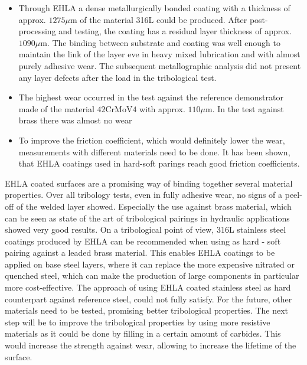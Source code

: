 \documentclass[10pt]{article}
\begin{document}
\begin{itemize}
  \item Through EHLA a dense metallurgically bonded coating with a thickness of approx. $1275 \mu \mathrm{m}$ of the material 316L could be produced. After post-processing and testing, the coating has a residual layer thickness of approx. $1090 \mu \mathrm{m}$. The binding between substrate and coating was well enough to maintain the link of the layer eve in heavy mixed lubrication and with almost purely adhesive wear. The subsequent metallographic analysis did not present any layer defects after the load in the tribological test.

  \item The highest wear occurred in the test against the reference demonstrator made of the material $42 \mathrm{CrMoV} 4$ with approx. $110 \mu \mathrm{m}$. In the test against brass there was almost no wear

  \item To improve the friction coefficient, which would definitely lower the wear, measurements with different materials need to be done. It has been shown, that EHLA coatings used in hard-soft parings reach good friction coefficients.

\end{itemize}

EHLA coated surfaces are a promising way of binding together several material properties. Over all tribology tests, even in fully adhesive wear, no signs of a peel-off of the welded layer showed. Especially the use against brass material, which can be seen as state of the art of tribological pairings in hydraulic applications showed very good results. On a tribological point of view, 316L stainless steel coatings produced by EHLA can be recommended when using as hard - soft pairing against a leaded brass material. This enables EHLA coatings to be applied on base steel layers, where it can replace the more expensive nitrated or quenched steel, which can make the production of large components in particular more cost-effective. The approach of using EHLA coated stainless steel as hard counterpart against reference steel, could not fully satisfy. For the future, other materials need to be tested, promising better tribological properties. The next step will be to improve the tribological properties by using more resistive materials as it could be done by filling in a certain amount of carbides. This would increase the strength against wear, allowing to increase the lifetime of the surface.
\end{document}
